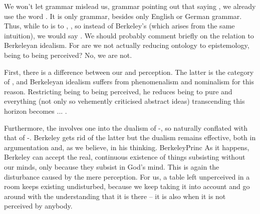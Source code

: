 

\label{sub:Berkeley}

\pa We won't let grammar mislead us, grammar pointing out that saying , we already use the word .  It is only grammar, besides
only English or German grammar.
%
Thus, while to  is to , , so instead of Berkeley's  (which arises from the
same intuition), we would say .
We should probably comment  briefly on the relation to Berkeleyan
idealism.  For are we not actually reducing ontology to epistemology, being to
being perceived? No, we are not.

First, there is a difference between our  and perception. The
latter is the category of , and Berkeleyan idealism suffers from
phenomenalism and nominalism for this reason. Restricting being to being
perceived, he reduces being to pure  and everything (not only
so vehemently criticised abstract ideas) transcending this horizon becomes
... . 

Furthermore, the  involves one into the dualism of
-, so naturally conflated with that of
-. Berkeley gets rid of the latter but the dualism remains
effective, both in argumentation and, as we believe, in his thinking.
\citet{Ideas imprinted on the sense are real things, or do really exist; this we
  do not deny, but we deny they can subsist without the minds which perceive
  them, or that they are resemblances of any archetypes existing without the
  mind;}{BerkeleyPrinc}{}
As it happens, Berkeley can accept the real, continuous existence of things
subsisting without our minds, only because they subsist in God's mind. This is
again the disturbance caused by the mere  perception. For us, a table
left unperceived in a room keeps existing undisturbed, because we keep taking it
into account and go around with the understanding that it is there -- it is
 also when it is not  perceived by anybody.

